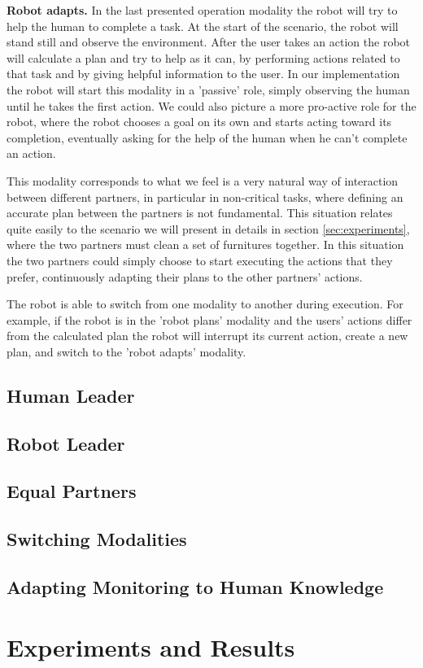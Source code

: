 \noindent
\textbf{Robot adapts.}
In the last presented operation modality the robot will try to help
the human to complete a task. At the start of the scenario, the robot
will stand still and observe the environment. After the user takes an
action the robot will calculate a plan and try to help as it can, by
performing actions related to that task and by giving helpful information to
the user. In our implementation the robot will start
this modality in a 'passive' role, simply observing the human until he
takes the first action. We could also picture a more pro-active role for
the robot, where the robot chooses a goal on its own and starts acting toward its
completion, eventually asking for the help of the human when he can't
complete an action. 

This modality corresponds to what we feel is a very natural way of
interaction between different partners, in particular in non-critical
tasks, where defining an accurate plan between the partners is not
fundamental. This situation relates quite easily to the scenario we
will present in details in section \ref{sec:experiments}, where the
two partners must clean a set of furnitures together. In this
situation the two partners could simply choose to start executing the
actions that they prefer, continuously adapting their plans to the
other partners' actions.  

The robot is able to switch from one modality to another during
execution. For example, if the robot is in the 'robot plans' modality and the
users' actions differ from the calculated plan the robot will
interrupt its current action, create a new plan, and switch to the
'robot adapts' modality.  


\subsection{Human Leader}
\subsection{Robot Leader}
\subsection{Equal Partners}
\subsection{Switching Modalities}
\subsection{Adapting Monitoring to Human Knowledge}


\section{Experiments and Results}



